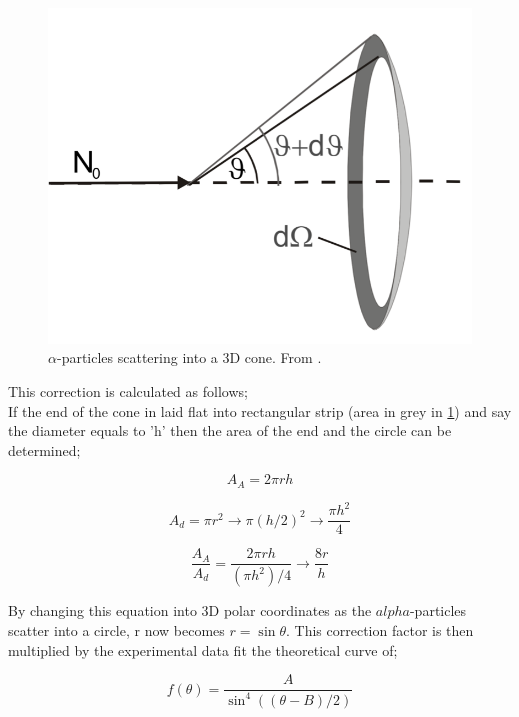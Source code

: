 \documentclass[12pt]{article}
\begin{document}
\begin{figure}[H]
\centering
\includegraphics[scale=0.5]{Images/six.png}
\caption{$\alpha$-particles scattering into a 3D cone. From \cite{Exp.6-2019}\cite{Two}.}
\label{3D Cone}
\end{figure}

This correction is calculated as follows; \\

If the end of the cone in laid flat into rectangular strip (area in grey in \cref{3D Cone}) and say the diameter equals to 'h' then the area of the end and the circle can be determined; 

\begin{equation}
A_A = 2\pi r h
\end{equation}

\begin{equation}
A_d = \pi r^2 \rightarrow \pi {(h/2)}^2 \rightarrow \dfrac{\pi h^2}{4}
\end{equation}

\begin{equation}
\dfrac{A_A}{A_d} = \dfrac{2 \pi r h}{(\pi h^2)/4} \rightarrow \dfrac{8r}{h}
\end{equation}
\vspace{0.2cm}

By changing this equation into 3D polar coordinates as the $alpha$-particles scatter into a circle, r now becomes $r = \sin \theta$. This correction factor is then multiplied by the experimental data fit the theoretical curve of;

\begin{equation}
f(\theta) = \dfrac{A}{\sin^4((\theta - B)/2)}
\label{Theory Eq}
\end{equation}
\vspace{0.2cm}
\end{document}
